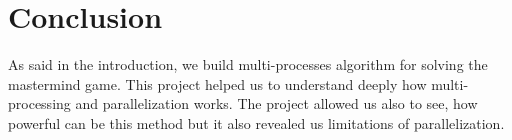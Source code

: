 \section{Conclusion}
As said in the introduction, we build multi-processes algorithm for solving the mastermind game. This project helped us to understand deeply how multi-processing and parallelization works. The project allowed us also to see, how powerful can be this method but it also revealed us limitations of parallelization.
